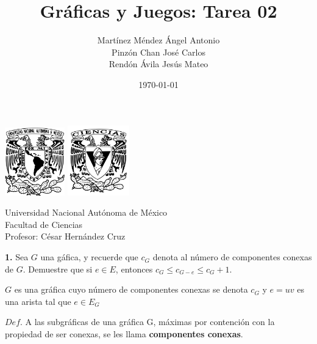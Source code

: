 \documentclass[12pt]{article}
\title{\textbf{Gráficas y Juegos: Tarea 02}}
\author{Martínez Méndez Ángel Antonio\\Pinzón Chan José Carlos\\Rendón Ávila Jesús Mateo}
\date{\today}
\begin{document}
\maketitle
\begin{center}
\vspace{3cm}
\includegraphics[width=0.195\textwidth]{Escudo.png}
\hspace{0.5cm}
\includegraphics[width=0.2\textwidth]{logo_ciencias.png}
\end{center}
\begin{center}
    \vspace{1cm}
    Universidad Nacional Autónoma de México\\
    Facultad de Ciencias\\
    Profesor: César Hernández Cruz\\
\end{center}

\newpage

%
%
\textbf{1.} Sea $G$ una gáfica, y recuerde que $c_G$ denota al número de componentes conexas de $G$.
Demuestre que si $e \in E$, entonces $c_G \leq c_{G - e} \leq c_G + 1$.\\

\begin{tcolorbox}[title=\textbf{Hipotesis}, colback=red!15!white, colframe=black!, breakable]
	$G$ es una  gráfica cuyo número de componentes conexas se denota $c_G$ y $e = uv$ es una arista tal que $e \in E_G$
\end{tcolorbox}

\begin{tcolorbox}[title=\textbf{Definiciones}, colback=blue!15!white, colframe=black!, breakable]
    $Def$. A las subgráficas de una gráfica G, máximas por contención con la propiedad de ser conexas, se les llama \textbf{componentes conexas}.
\end{tcolorbox}
\end{document}
